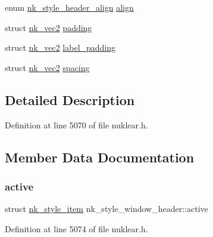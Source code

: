 \begin{DoxyCompactItemize}
\item 
enum \mbox{\hyperlink{nuklear_8h_ae05e44870132244e24e5f5139f74186e}{nk\+\_\+style\+\_\+header\+\_\+align}} \mbox{\hyperlink{structnk__style__window__header_ac625860b1a7a856e0b029b53bdc15c04}{align}}
\item 
struct \mbox{\hyperlink{structnk__vec2}{nk\+\_\+vec2}} \mbox{\hyperlink{structnk__style__window__header_a52553e15d47afbf06908e8a1949e12e2}{padding}}
\item 
struct \mbox{\hyperlink{structnk__vec2}{nk\+\_\+vec2}} \mbox{\hyperlink{structnk__style__window__header_af36619005a7a69b06fcc037369a7e9e4}{label\+\_\+padding}}
\item 
struct \mbox{\hyperlink{structnk__vec2}{nk\+\_\+vec2}} \mbox{\hyperlink{structnk__style__window__header_a590cfd4a72e89b1fba9b3b966bf8ef5c}{spacing}}
\end{DoxyCompactItemize}


\subsection{Detailed Description}


Definition at line 5070 of file nuklear.\+h.



\subsection{Member Data Documentation}
\mbox{\label{structnk__style__window__header_a59505c74fca60c0a6c8b2e8ebe8e4c4a}} 
\subsubsection{\texorpdfstring{active}{active}}
{\footnotesize\ttfamily struct \mbox{\hyperlink{structnk__style__item}{nk\+\_\+style\+\_\+item}} nk\+\_\+style\+\_\+window\+\_\+header\+::active}



Definition at line 5074 of file nuklear.\+h.

\mbox{\label{structnk__style__window__header_ac625860b1a7a856e0b029b53bdc15c04}} 
